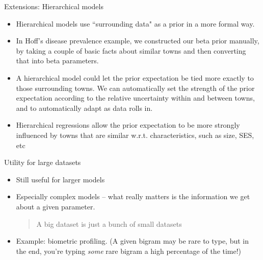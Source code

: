 \documentclass[10pt]{beamer}
\begin{document}
\begin{frame}{Extensions: Hierarchical models}

\begin{itemize}
\item Hierarchical models use ``surrounding data" as a prior in a more formal way.   
\item In Hoff's disease prevalence example,  we constructed our beta prior manually,  by taking a couple of basic facts about similar towns and then converting that into beta parameters.    
\item A hierarchical model could let the prior expectation be tied more exactly to those surrounding towns.   We can automatically set the strength of the prior expectation according to the relative uncertainty within and between towns,  and to automatically adapt as data rolls in. 
\item Hierarchical regressions allow the prior expectation to be more strongly influenced by towns that are similar w.r.t.  characteristics,  such as size,  SES,  etc
\end{itemize}
\end{frame}

\begin{frame}{Utility for large datasets}


\begin{itemize}
\item Still useful for larger models
\vfill 
\item Especially complex models -- what really matters is the information we get about a given parameter.
\vfill 
\begin{quotation}
A big dataset is just a bunch of small datasets	
\end{quotation}
\vfill 
\item Example: biometric profiling.  {\tiny (A given bigram may be rare to type, but in the end, you're typing \textit{some} rare bigram a high percentage of the time!) }
\end{itemize}

\end{frame}
\end{document}
